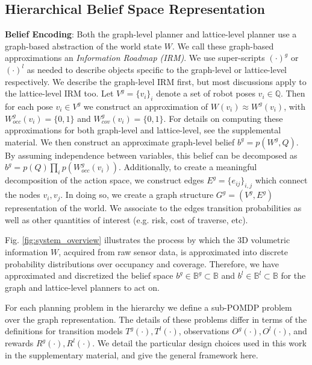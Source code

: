 \documentclass{article}
\newcommand{\ph}[1]{{\textbf{#1}:}} %
\begin{document}
\subsection{Hierarchical Belief Space Representation} 

\ph{Belief Encoding} Both the graph-level planner and lattice-level planner use a graph-based abstraction of the world state $W$.  We call these graph-based approximations an \textit{Information Roadmap (IRM)}. %
We use super-scripts $(\cdot)^g$ or $(\cdot)^l$ as needed to describe objects specific to the graph-level or lattice-level respectively. We describe the graph-level IRM first, but most discussions apply to the lattice-level IRM too. Let $V^g=\{v_i\}_i$ denote a set of robot poses $v_i\in \mathbb{Q}$.  Then for each pose $v_i\in V^g$ we construct an approximation of $W(v_i) \approx W^g(v_i)$, with $W_{occ}^g(v_i) = \{0,1\}$ and $W_{cov}^g(v_i) = \{0,1\}$.  %
For details on computing these approximations for both graph-level and lattice-level, see the supplemental material.  We then construct an approximate graph-level belief $b^g=p(W^g, Q)$.  By assuming independence between variables, this belief can be decomposed as $b^g=p(Q)\prod_i p(W_{occ}^g(v_i))$.  Additionally, to create a meaningful decomposition of the action space, we construct edges $E^g=\{e_{ij}\}_{i,j}$ which connect the nodes $v_i, v_j$.  In doing so, we create a graph structure $G^g=(V^g, E^g)$ representation of the world.  We associate to the edges transition probabilities as well as other quantities of interest (e.g. risk, cost of traverse, etc).

Fig. \ref{fig:system_overview} illustrates the process by which the 3D volumetric information $W$, acquired from raw sensor data, is approximated into discrete probability distributions over occupancy and coverage. 
Therefore, we have approximated and discretized the belief space $b^g\in\mathbb{B}^g\subset\mathbb{B}$ and $b^l\in\mathbb{B}^l\subset\mathbb{B}$ for the graph and lattice-level planners to act on.

For each planning problem in the hierarchy we define a sub-POMDP problem over the graph representation.  The details of these problems differ in terms of the definitions for transition models $T^g(\cdot),T^l(\cdot)$, observations $O^g(\cdot),O^l(\cdot)$, and rewards $R^g(\cdot),R^l(\cdot)$.  We detail the particular design choices used in this work in the supplementary material, and give the general framework here.
\end{document}
